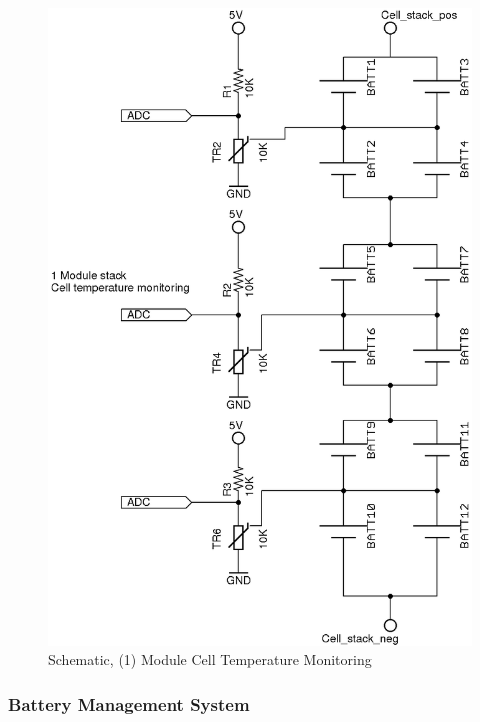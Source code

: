 \documentclass{article}
\begin{document}


            \begin{figure}[H]
            \centering
            \includegraphics[width = 0.5 \textwidth]{celltemp}
            \caption{Schematic, (1) Module Cell Temperature Monitoring}
            \label{celltemp}
            \end{figure}

        \subsubsection{Battery Management System} \label{bms}


\end{document}
